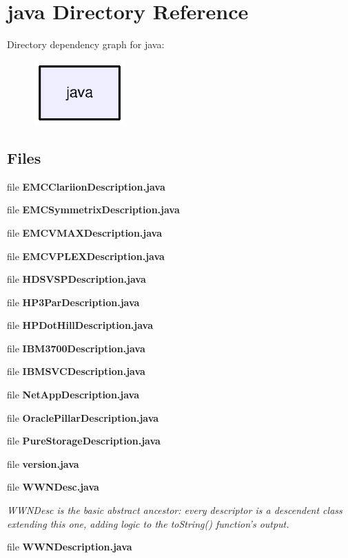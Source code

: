 \section{java Directory Reference}
\label{dir_93c6ba7fb77bae0709fae89c9c13b44a}
Directory dependency graph for java\-:\nopagebreak
\begin{figure}[H]
\begin{center}
\leavevmode
\includegraphics[width=98pt]{dir_93c6ba7fb77bae0709fae89c9c13b44a_dep}
\end{center}
\end{figure}
\subsection*{Files}
\begin{DoxyCompactItemize}
\item 
file {\bf E\-M\-C\-Clariion\-Description.\-java}
\item 
file {\bf E\-M\-C\-Symmetrix\-Description.\-java}
\item 
file {\bf E\-M\-C\-V\-M\-A\-X\-Description.\-java}
\item 
file {\bf E\-M\-C\-V\-P\-L\-E\-X\-Description.\-java}
\item 
file {\bf H\-D\-S\-V\-S\-P\-Description.\-java}
\item 
file {\bf H\-P3\-Par\-Description.\-java}
\item 
file {\bf H\-P\-Dot\-Hill\-Description.\-java}
\item 
file {\bf I\-B\-M3700\-Description.\-java}
\item 
file {\bf I\-B\-M\-S\-V\-C\-Description.\-java}
\item 
file {\bf Net\-App\-Description.\-java}
\item 
file {\bf Oracle\-Pillar\-Description.\-java}
\item 
file {\bfseries Pure\-Storage\-Description.\-java}
\item 
file {\bf version.\-java}
\item 
file {\bf W\-W\-N\-Desc.\-java}
\begin{DoxyCompactList}\small\item\em W\-W\-N\-Desc is the basic abstract ancestor\-: every descriptor is a descendent class extending this one, adding logic to the to\-String() function's output. \end{DoxyCompactList}\item 
file {\bf W\-W\-N\-Description.\-java}
\end{DoxyCompactItemize}
